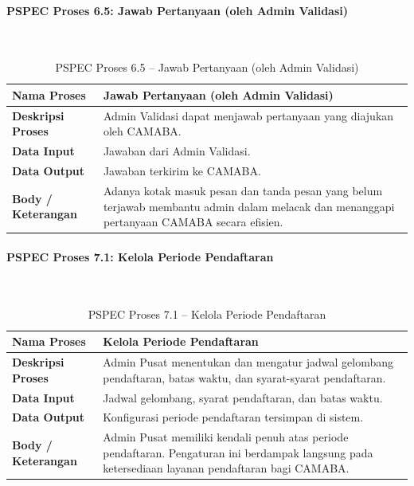 \paragraph{PSPEC Proses 6.5: Jawab Pertanyaan (oleh Admin Validasi)}~\\
\begin{longtable}{|p{}|p{}|}
	\caption{PSPEC Proses 6.5 -- Jawab Pertanyaan (oleh Admin Validasi)}
	\label{table:3.pspec65}\\
	\hline
	\textbf{Nama Proses} & Jawab Pertanyaan (oleh Admin Validasi) \\
	\hline
	\textbf{Deskripsi Proses} & Admin Validasi dapat menjawab pertanyaan yang diajukan oleh CAMABA. \\
	\hline
	\textbf{Data Input} & Jawaban dari Admin Validasi. \\
	\hline
	\textbf{Data Output} & Jawaban terkirim ke CAMABA. \\
	\hline
	\textbf{Body / Keterangan} & Adanya kotak masuk pesan dan tanda pesan yang belum terjawab membantu admin dalam melacak dan menanggapi pertanyaan CAMABA secara efisien. \\
	\hline
\end{longtable}

\paragraph{PSPEC Proses 7.1: Kelola Periode Pendaftaran}~\\
\begin{longtable}{|p{}|p{}|}
	\caption{PSPEC Proses 7.1 -- Kelola Periode Pendaftaran}
	\label{table:3.pspec71}\\
	\hline
	\textbf{Nama Proses} & Kelola Periode Pendaftaran \\
	\hline
	\textbf{Deskripsi Proses} & Admin Pusat menentukan dan mengatur jadwal gelombang pendaftaran, batas waktu, dan syarat-syarat pendaftaran. \\
	\hline
	\textbf{Data Input} & Jadwal gelombang, syarat pendaftaran, dan batas waktu. \\
	\hline
	\textbf{Data Output} & Konfigurasi periode pendaftaran tersimpan di sistem. \\
	\hline
	\textbf{Body / Keterangan} & Admin Pusat memiliki kendali penuh atas periode pendaftaran. Pengaturan ini berdampak langsung pada ketersediaan layanan pendaftaran bagi CAMABA. \\
	\hline
\end{longtable}

